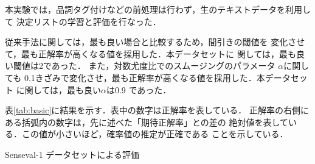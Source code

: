 本実験では，品詞タグ付けなどの前処理は行わず，生のテキストデータを利用して
決定リストの学習と評価を行なった．

従来手法に関しては，最も良い場合と比較するため，間引きの閾値を
変化させて，最も正解率が高くなる値を採用した．本データセットに
関しては，最も良い閾値は2であった．
また，対数尤度比でのスムージングのパラメータ $\alpha$に関しても
0.1きざみで変化させ，最も正解率が高くなる値を採用した．本データセット
に関しては，最も良い$\alpha$は0.9 であった．

表\ref{tab:basic}に結果を示す．表中の数字は正解率を表している．
正解率の右側にある括弧内の数字は，先に述べた「期待正解率」との差の
絶対値を表している．この値が小さいほど，確率値の推定が正確である
ことを示している．

\begin{table*}
  \caption{Senseval-1 データセットによる評価}
  

\end{table*}
